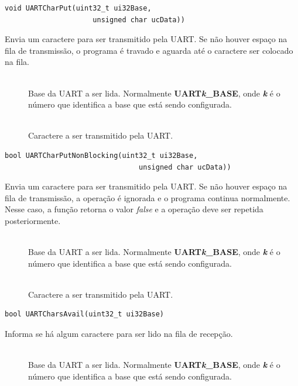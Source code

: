 \begin{lstlisting}[style=funcao]
	void UARTCharPut(uint32_t ui32Base,
					 unsigned char ucData))
\end{lstlisting}

Envia um caractere para ser transmitido pela UART. Se não houver espaço na fila de transmissão, o programa é travado e aguarda até o caractere ser colocado na fila.

\begin{description}
	\item []\hfill \\
	Base da UART a ser lida. Normalmente \textbf{UART\emph{k}\_BASE}, onde \textbf{\emph{k}} é o número que identifica a base que está sendo configurada.
	
	\item []\hfill \\
	Caractere a ser transmitido pela UART.
\end{description}

\begin{lstlisting}[style=funcao]
	bool UARTCharPutNonBlocking(uint32_t ui32Base,
								unsigned char ucData))
\end{lstlisting}

Envia um caractere para ser transmitido pela UART. Se não houver espaço na fila de transmissão, a operação é ignorada e o programa continua normalmente. Nesse caso, a função retorna o valor \emph{false} e a operação deve ser repetida posteriormente.

\begin{description}
	\item []\hfill \\
	Base da UART a ser lida. Normalmente \textbf{UART\emph{k}\_BASE}, onde \textbf{\emph{k}} é o número que identifica a base que está sendo configurada.
	
	\item []\hfill \\
	Caractere a ser transmitido pela UART.
\end{description}

\begin{lstlisting}[style=funcao]
	bool UARTCharsAvail(uint32_t ui32Base)
\end{lstlisting}

Informa se há algum caractere para ser lido na fila de recepção.

\begin{description}
	\item []\hfill \\
	Base da UART a ser lida. Normalmente \textbf{UART\emph{k}\_BASE}, onde \textbf{\emph{k}} é o número que identifica a base que está sendo configurada.
\end{description}

